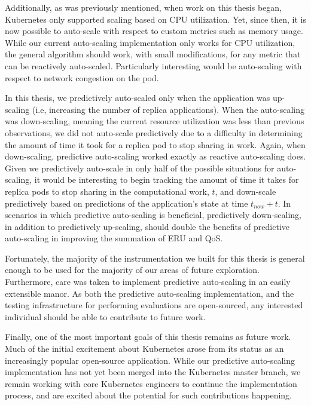 Additionally, as was previously mentioned, when work on this thesis began,
Kubernetes only supported scaling based on CPU utilization. Yet, since then, it
is now possible to auto-scale with respect to custom metrics such as memory
usage. While our current auto-scaling implementation only works for CPU
utilization, the general algorithm should work, with small modifications, for
any metric that can be reactively auto-scaled. Particularly interesting would
be auto-scaling with respect to network congestion on the pod.

In this thesis, we predictively auto-scaled
only when the application was up-scaling (i.e, increasing the number of replica
applications). When the auto-scaling was down-scaling, meaning the current
resource utilization was less than previous observations, we did not auto-scale
predictively due to a difficulty in determining the amount of time it took for a
replica pod to stop sharing in work. Again, when down-scaling, predictive
auto-scaling worked exactly as reactive auto-scaling does. Given we predictively
auto-scale in only half of the possible situations for auto-scaling, it would be
interesting to begin tracking the amount of time it takes for replica pods to
stop sharing in the computational work, $t$, and down-scale predictively based on
predictions of the application's state at time $t_{now} + t$. In scenarios in
which predictive auto-scaling is beneficial, predictively down-scaling, in
addition to predictively up-scaling, should double the benefits of predictive
auto-scaling in improving the summation of ERU and QoS.

Fortunately, the majority of the instrumentation we built for this thesis is general
enough to be used for the majority of our areas of future exploration.
Furthermore, care was taken to implement predictive auto-scaling in an easily
extensible manor. As both the predictive auto-scaling implementation, and the
testing infrastructure for performing evaluations are open-sourced, any
interested individual should be able to contribute to future work.

Finally, one of the most important goals of this thesis remains as future work.
Much of the initial excitement about Kubernetes arose from its status as an
increasingly popular open-source application. While our predictive auto-scaling
implementation has not yet been merged into the Kubernetes master branch, we
remain working with core Kubernetes engineers to continue the implementation
process, and are excited about the potential for such contributions happening.
